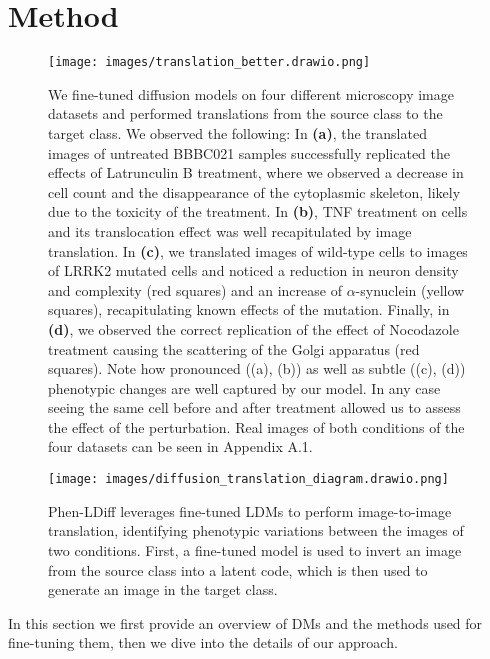 \section{Method}
\label{sec:formatting}

\begin{figure*}
  \centering
  \texttt{[image: images/translation\_better.drawio.png]} %
  \caption{We fine-tuned diffusion models on four different microscopy image datasets and performed translations from the source class to the target class. We observed the following: In \textbf{(a)}, the translated images of untreated BBBC021 samples successfully replicated the effects of Latrunculin B treatment, where we observed a decrease in cell count and the disappearance of the cytoplasmic skeleton, likely due to the toxicity of the treatment. In \textbf{(b)}, TNF treatment on cells and its translocation effect was well recapitulated by image translation. In \textbf{(c)}, we translated images of wild-type cells to images of LRRK2 mutated cells and noticed a reduction in neuron density and complexity (red squares) and an increase of $\alpha$-synuclein (yellow squares), recapitulating known effects of the mutation. Finally, in \textbf{(d)}, we observed the correct replication of the effect of Nocodazole treatment causing the scattering of the Golgi apparatus (red squares). Note how pronounced ((a), (b)) as well as subtle ((c), (d)) phenotypic changes are well captured by our model. In any case seeing the same cell before and after treatment allowed us to assess the effect of the perturbation. Real images of both conditions of the four datasets can be seen in Appendix A.1.}
  \label{fig:img_translation}
\end{figure*}


\begin{figure}
  \centering
  \texttt{[image: images/diffusion\_translation\_diagram.drawio.png]} %
  \caption{Phen-LDiff leverages fine-tuned LDMs to perform image-to-image translation, identifying phenotypic variations between the images of two conditions. First, a fine-tuned model is used to invert an image from the source class into a latent code, which is then used to generate an image in the target class.}
  
  \label{fig:architecture}
\end{figure}
In this section we first provide an overview of DMs and the methods used for fine-tuning them, then we dive into the details of our approach.

